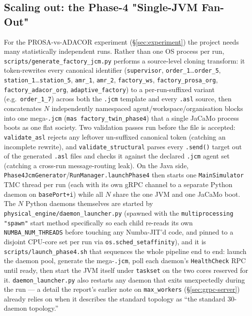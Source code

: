 \documentclass[twocolumn,10pt,a4paper]{article}
\newcommand{\code}[1]{\texttt{\small #1}}
\newcommand{\file}[1]{\texttt{#1}}
\begin{document}
\subsection{Scaling out: the Phase-4 "Single-JVM Fan-Out"}
\label{sec:fanout}
For the PROSA-vs-ADACOR experiment (\S\ref{sec:experiment}) the project needs many statistically independent runs. Rather than one OS process per run, \file{scripts/generate\_factory\_jcm.py} performs a source-level cloning transform: it token-rewrites every canonical identifier (\code{supervisor}, \code{order\_1}\ldots\code{order\_5}, \code{station\_1}\ldots\code{station\_5}, \code{amr\_1}, \code{amr\_2}, \code{factory\_ws}, \code{factory\_prosa\_org}, \code{factory\_adacor\_org}, \code{adaptive\_factory}) to a per-run-suffixed variant (e.g.\ \code{order\_1\_7}) across both the \code{.jcm} template and every \code{.asl} source, then concatenates $N$ independently namespaced agent/workspace/organisation blocks into one mega-\code{.jcm} (\code{mas factory\_twin\_phase4}) that a single JaCaMo process boots as one flat society. Two validation passes run before the file is accepted: \code{validate\_asl} rejects any leftover un-suffixed canonical token (catching an incomplete rewrite), and \code{validate\_structural} parses every \code{.send()} target out of the generated \code{.asl} files and checks it against the declared \code{.jcm} agent set (catching a cross-run message-routing leak). On the Java side, \code{Phase4JcmGenerator}/\code{RunManager.launchPhase4} then starts one \code{MainSimulator} TMC thread per run (each with its own gRPC channel to a separate Python daemon on \code{basePort+i}) while all $N$ share the one JVM and one JaCaMo boot. The $N$ Python daemons themselves are started by \file{physical\_engine/daemon\_launcher.py} (spawned with the \code{multiprocessing} \code{"spawn"} start method specifically so each child re-reads its own \code{NUMBA\_NUM\_THREADS} before touching any Numba-JIT'd code, and pinned to a disjoint CPU-core set per run via \code{os.sched\_setaffinity}), and it is \file{scripts/launch\_phase4.sh} that sequences the whole pipeline end to end: launch the daemon pool, generate the mega-\code{.jcm}, poll each daemon's \code{HealthCheck} RPC until ready, then start the JVM itself under \code{taskset} on the two cores reserved for it. \code{daemon\_launcher.py} also restarts any daemon that exits unexpectedly during the run --- a detail the report's earlier note on \code{max\_workers} (\S\ref{sec:grpc-server}) already relies on when it describes the standard topology as ``the standard 30-daemon topology.''
\end{document}
